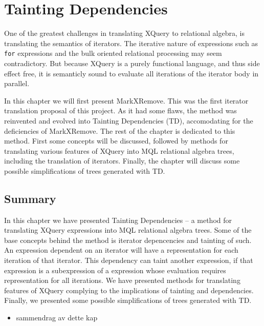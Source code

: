 \chapter{Tainting Dependencies}
\label{sect:translation}
\label{chapter:translation}

One of the greatest challenges in translating XQuery to relational algebra, is translating the semantics of
iterators. The iterative nature of expressions such as \texttt{for} expressions and the bulk oriented relational
processing may seem contradictory. But because XQuery is a purely functional language, and thus side effect free,
it is semanticly sound to evaluate all iterations of the iterator body in parallel.

In this chapter we will first present MarkXRemove. This was the first iterator translation proposal of this
project. As it had some flaws, the method was reinvented and evolved into Tainting Dependencies (TD), accomodating
for the deficiencies of MarkXRemove. The rest of the chapter is dedicated to this method. First some concepts will
be discussed, followed by methods for translating various features of XQuery into MQL relational algebra trees,
including the translation of iterators. Finally, the chapter will discuss some possible simplifications of trees
generated with TD.












\section{Summary}
\label{sect:trans:summary}

In this chapter we have presented Tainting Dependencies -- a method for translating XQuery expressions into MQL
relational algebra trees. Some of the base concepts behind the method is iterator depencencies and tainting of
such. An expression dependent on an iterator will have a representation for each iteration of that iterator. This
dependency can taint another expression, if that expression is a subexpression of a expression whose evaluation
requires representation for all iterations. We have presented methods for translating features of XQuery complying
to the implications of tainting and dependencies. Finally, we presented some possible simplifications of trees
generated with TD.



\begin{itemize}
  \item sammendrag av dette kap
\end{itemize}